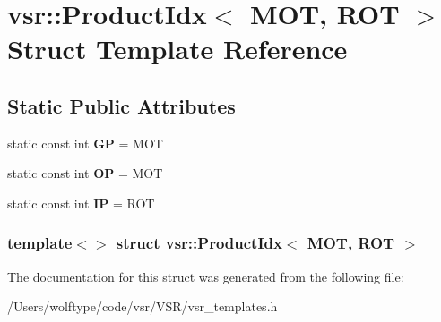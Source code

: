 \hypertarget{structvsr_1_1_product_idx_3_01_m_o_t_00_01_r_o_t_01_4}{\section{vsr\-:\-:Product\-Idx$<$ M\-O\-T, R\-O\-T $>$ Struct Template Reference}
\label{structvsr_1_1_product_idx_3_01_m_o_t_00_01_r_o_t_01_4}
}
\subsection*{Static Public Attributes}
\begin{DoxyCompactItemize}
\item 
\hypertarget{structvsr_1_1_product_idx_3_01_m_o_t_00_01_r_o_t_01_4_aff8483ea9cf6cc4ea7501953b92f7e20}{static const int {\bfseries G\-P} = M\-O\-T}\label{structvsr_1_1_product_idx_3_01_m_o_t_00_01_r_o_t_01_4_aff8483ea9cf6cc4ea7501953b92f7e20}

\item 
\hypertarget{structvsr_1_1_product_idx_3_01_m_o_t_00_01_r_o_t_01_4_a614db4103c35c1bbcc67f746f72550c9}{static const int {\bfseries O\-P} = M\-O\-T}\label{structvsr_1_1_product_idx_3_01_m_o_t_00_01_r_o_t_01_4_a614db4103c35c1bbcc67f746f72550c9}

\item 
\hypertarget{structvsr_1_1_product_idx_3_01_m_o_t_00_01_r_o_t_01_4_a88ae6dd3b6ecd72cd704f6e208f64605}{static const int {\bfseries I\-P} = R\-O\-T}\label{structvsr_1_1_product_idx_3_01_m_o_t_00_01_r_o_t_01_4_a88ae6dd3b6ecd72cd704f6e208f64605}

\end{DoxyCompactItemize}
\subsubsection*{template$<$$>$ struct vsr\-::\-Product\-Idx$<$ M\-O\-T, R\-O\-T $>$}



The documentation for this struct was generated from the following file\-:\begin{DoxyCompactItemize}
\item 
/\-Users/wolftype/code/vsr/\-V\-S\-R/vsr\-\_\-templates.\-h\end{DoxyCompactItemize}
